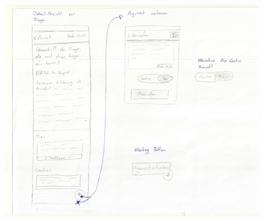 \clearpage
\begin{figure}
  \vspace{-20pt}
  \begin{center}
    \includegraphics[width=0.99\textwidth]{./images/entwuerfe/toby3}
  \end{center}
  \vspace{-40pt}
\end{figure}

